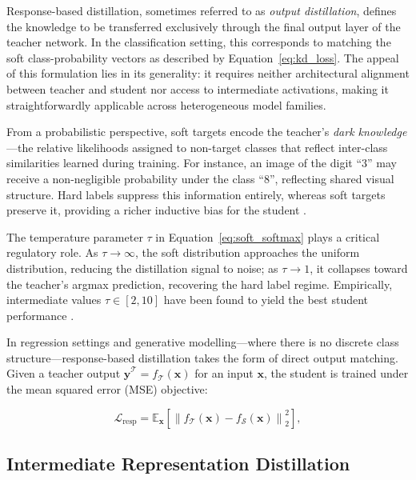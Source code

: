 Response-based distillation, sometimes referred to as \emph{output distillation}, defines the knowledge to
be transferred exclusively through the final output layer of the teacher network.
In the classification setting, this corresponds to matching the soft class-probability vectors as
described by Equation~\ref{eq:kd_loss}.
The appeal of this formulation lies in its generality: it requires neither architectural alignment between
teacher and student nor access to intermediate activations, making it straightforwardly applicable across
heterogeneous model families.

From a probabilistic perspective, soft targets encode the teacher's \emph{dark knowledge}—the relative
likelihoods assigned to non-target classes that reflect inter-class similarities learned during training.
For instance, an image of the digit ``3'' may receive a non-negligible probability under the class ``8'',
reflecting shared visual structure.
Hard labels suppress this information entirely, whereas soft targets preserve it, providing a richer
inductive bias for the student \cite{hinton2015distilling}.

The temperature parameter $\tau$ in Equation~\ref{eq:soft_softmax} plays a critical regulatory role.
As $\tau \to \infty$, the soft distribution approaches the uniform distribution, reducing the distillation
signal to noise; as $\tau \to 1$, it collapses toward the teacher's argmax prediction, recovering the hard
label regime.
Empirically, intermediate values $\tau \in [2, 10]$ have been found to yield the best student performance
\cite{hinton2015distilling}.

In regression settings and generative modelling—where there is no discrete class structure—response-based
distillation takes the form of direct output matching.
Given a teacher output $\hat{\mathbf{y}}^{\mathcal{T}} = f_{\mathcal{T}}(\mathbf{x})$ for an input
$\mathbf{x}$, the student is trained under the mean squared error (MSE) objective:

\begin{equation}
    \mathcal{L}_{\mathrm{resp}} = \mathbb{E}_{\mathbf{x}}\!\left[\left\| f_{\mathcal{T}}(\mathbf{x}) - f_{\mathcal{S}}(\mathbf{x}) \right\|_2^2\right],
    \label{eq:response_mse}
\end{equation}

\subsection{Intermediate Representation Distillation}
\label{subsec:kd_feature}

